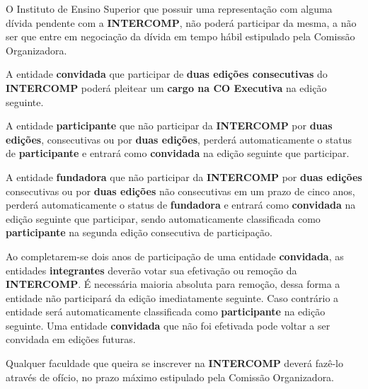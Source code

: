\begin{article}
	\begin{xparagraph}
		O Instituto de Ensino Superior que possuir uma representação com alguma dívida pendente com a \textbf{INTERCOMP}, não poderá participar da mesma, a não ser que entre em negociação da dívida em tempo hábil estipulado pela Comissão Organizadora.
	\end{xparagraph}

	\begin{xparagraph}
		A entidade \textbf{convidada} que participar de \textbf{duas edições consecutivas} do \textbf{INTERCOMP} poderá pleitear um \textbf{cargo na CO Executiva} na edição seguinte.
	\end{xparagraph}

	\begin{xparagraph}
		A entidade \textbf{participante} que não participar da \textbf{INTERCOMP} por \textbf{duas edições}, consecutivas ou por \textbf{duas edições}, perderá automaticamente o status de \textbf{participante} e entrará como \textbf{convidada} na edição seguinte que participar.
	\end{xparagraph}

	\begin{xparagraph}
		A entidade \textbf{fundadora} que não participar da \textbf{INTERCOMP} por \textbf{duas edições} consecutivas ou por \textbf{duas edições} não consecutivas em um prazo de cinco anos, perderá automaticamente o status de \textbf{fundadora} e entrará como \textbf{convidada} na edição seguinte que participar, sendo automaticamente classificada como \textbf{participante} na segunda edição consecutiva de participação.
	\end{xparagraph}
\end{article}

\begin{article}
	Ao completarem-se dois anos de participação de uma entidade \textbf{convidada}, as entidades \textbf{integrantes} deverão votar sua efetivação ou remoção da \textbf{INTERCOMP}. É necessária maioria absoluta para remoção, dessa forma a entidade não participará da edição imediatamente seguinte. Caso contrário a entidade será automaticamente classificada como \textbf{participante} na edição seguinte. Uma entidade \textbf{convidada} que não foi efetivada pode voltar a ser convidada em edições futuras.
\end{article}

\begin{article}
	Qualquer faculdade que queira se inscrever na \textbf{INTERCOMP} deverá fazê-lo através de ofício, no prazo máximo estipulado pela Comissão Organizadora.
\end{article}

